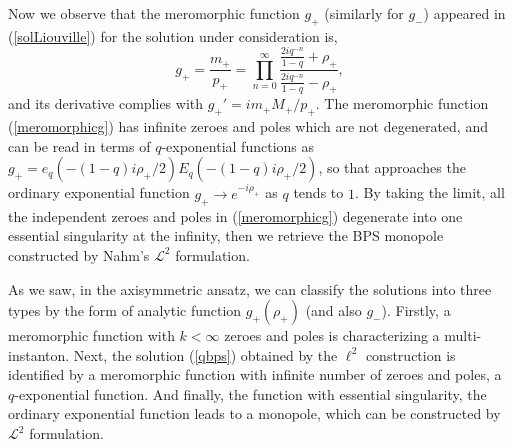 \documentclass[a4paper,10pt]{article}
\begin{document}
Now we observe that the meromorphic function $g_+$ (similarly for $g_-$) appeared in (\ref{solLiouville}) for the  solution under consideration is,
\begin{equation}
g_+=\frac{m_+}{p_+}=\prod_{n=0}^\infty\frac{\frac{2iq^{-n}}{1-q}+\rho_+}{\frac{2iq^{-n}}{1-q}-\rho_+},\label{meromorphicg}
\end{equation}
and its derivative complies with $g_+'=im_+ M_+/p_+$.
The meromorphic function (\ref{meromorphicg}) has infinite zeroes and poles which are not degenerated, and can be read in terms of $q$-exponential functions as $g_+=e_q(-(1-q)i\rho_+/2)E_q(-(1-q)i\rho_+/2)$, so that approaches the ordinary exponential function $g_+ \to e^{-i\rho_+}$ as $q$ tends to $1$.
By taking the limit, all the independent zeroes and poles in (\ref{meromorphicg}) degenerate into one essential singularity at the infinity, then we retrieve the BPS monopole constructed by Nahm's $\mathcal{L}^2$ formulation.


As we saw, in the axisymmetric ansatz, we can classify the solutions into three types by the form of analytic function $g_+(\rho_+)$ (and also $g_-$).
Firstly, a meromorphic function with $k<\infty$ zeroes and poles is characterizing a multi-instanton.
Next, the solution (\ref{qbps}) obtained by the $\ell^2$ construction is identified by a meromorphic function with infinite number of zeroes and poles, a $q$-exponential function.
And finally, the function with essential singularity, the ordinary exponential function leads to a monopole, which can be constructed by $\mathcal{L}^2$ formulation.



\end{document}
